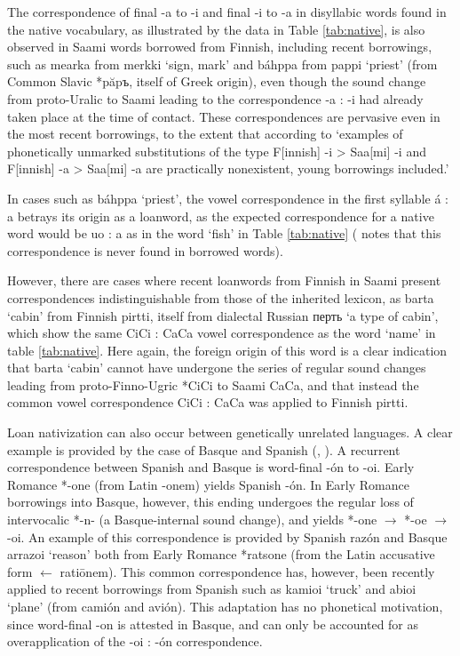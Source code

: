 \documentclass[svgnames,12pt]{scrartcl}
\newcommand{\ipa}[1]{{{\phon\mbox{#1}}}}
\begin{document}
{{The correspondence of final \ipa{-a} to \ipa{-i} and final \ipa{-i} to \ipa{-a} in disyllabic words found in the native vocabulary, as illustrated by the data in Table \ref{tab:native}, is also observed in Saami words borrowed from Finnish, including recent borrowings, such as \ipa{mearka} from \ipa{merkki} `sign, mark' and \ipa{báhppa} from \ipa{pappi} `priest' (from Common Slavic *\ipa{păpъ}, itself of Greek origin), even though the sound change from proto-Uralic to Saami leading to the correspondence \ipa{-a} : \ipa{-i} had already taken place at the time of contact. These correspondences are pervasive even in the most recent borrowings, to the extent that according to \citet[36]{aikio06nativization} `examples of phonetically unmarked substitutions of the type F[innish] \ipa{-i} > Saa[mi] \ipa{-i} and F[innish] \ipa{-a} > Saa[mi] \ipa{-a} are practically nonexistent, young borrowings included.'

In cases such as \ipa{báhppa} `priest', the vowel correspondence in the first syllable \ipa{á} : \ipa{a} betrays its origin as a loanword, as the expected correspondence for a native word would be \ipa{uo} : \ipa{a} as in the word `fish' in Table \ref{tab:native} (\citealt[35]{aikio06nativization} notes that this correspondence is never found in borrowed words).

However, there are cases where recent loanwords from Finnish in Saami present correspondences indistinguishable from those of the inherited lexicon, as \ipa{barta} `cabin' from Finnish \ipa{pirtti}, itself from dialectal Russian \ipa{перть} `a type of cabin', which show the same \ipa{CiCi} : \ipa{CaCa} vowel correspondence as the word `name' in table \ref{tab:native}. Here again, the foreign origin of this word is a clear indication that \ipa{barta} `cabin' cannot have undergone the series of regular sound changes leading from proto-Finno-Ugric *\ipa{CiCi} to Saami \ipa{CaCa}, and that instead the common vowel correspondence \ipa{CiCi} : \ipa{CaCa} was applied to Finnish \ipa{pirtti}.
 
Loan nativization can also occur between genetically unrelated languages. A clear example is provided by the case of Basque and Spanish (\citealt[53-54]{trask00chronology}, \citealt[21-3]{aikio06nativization}). 
A recurrent correspondence between Spanish and Basque is word-final \ipa{-ón} to \ipa{-oi}. Early Romance *\ipa{-one} (from Latin \ipa{-onem}) yields Spanish \ipa{-ón}. In Early Romance borrowings into Basque, however, this ending undergoes the regular loss of intervocalic *\ipa{-n-} (a Basque-internal sound change), and yields *\ipa{-one} $\rightarrow$ *\ipa{-oe} $\rightarrow$ \ipa{-oi}. An example of this correspondence is provided by Spanish \ipa{razón} and Basque \ipa{arrazoi} `reason' both from Early Romance *\ipa{ratsone} (from the Latin accusative form $\leftarrow$ \ipa{ratiōnem}).
This common correspondence has, however, been recently applied to recent borrowings from Spanish such as \ipa{kamioi} `truck' and \ipa{abioi} `plane' (from \ipa{camión} and \ipa{avión}). This adaptation has no phonetical motivation, since word-final \ipa{-on} is attested in Basque, and can only be accounted for as overapplication of the \ipa{-oi} : \ipa{-ón} correspondence.
 
}}
\end{document}
